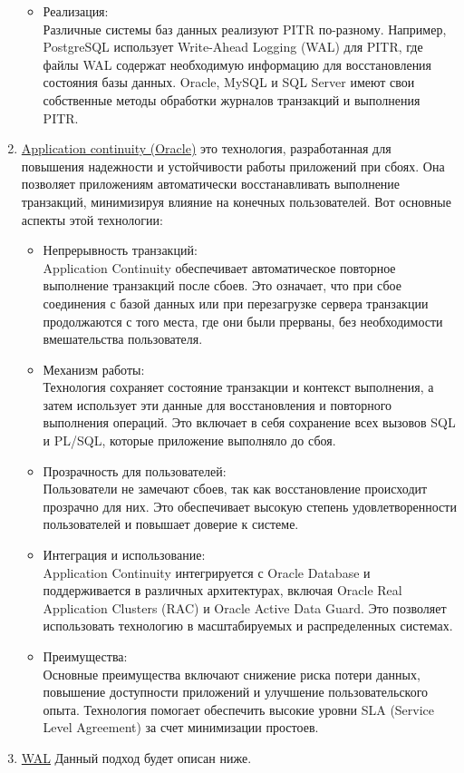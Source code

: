 \begin{enumerate}
\begin{itemize}
        \item Реализация: \\
        Различные системы баз данных реализуют PITR по-разному. Например, PostgreSQL использует Write-Ahead Logging (WAL) для PITR, где файлы WAL содержат необходимую информацию для восстановления состояния базы данных. Oracle, MySQL и SQL Server имеют свои собственные методы обработки журналов транзакций и выполнения PITR.
    \end{itemize}
    \item \underline{Application continuity (Oracle)} \cite{availability-ApplicationContinuity} это технология, разработанная для повышения надежности и устойчивости работы приложений при сбоях. Она позволяет приложениям автоматически восстанавливать выполнение транзакций, минимизируя влияние на конечных пользователей. Вот основные аспекты этой технологии:
    \begin{itemize}
        \item Непрерывность транзакций: \\
        Application Continuity обеспечивает автоматическое повторное выполнение транзакций после сбоев. Это означает, что при сбое соединения с базой данных или при перезагрузке сервера транзакции продолжаются с того места, где они были прерваны, без необходимости вмешательства пользователя.
        \item Механизм работы: \\
        Технология сохраняет состояние транзакции и контекст выполнения, а затем использует эти данные для восстановления и повторного выполнения операций. Это включает в себя сохранение всех вызовов SQL и PL/SQL, которые приложение выполняло до сбоя.
        \item Прозрачность для пользователей: \\
        Пользователи не замечают сбоев, так как восстановление происходит прозрачно для них. Это обеспечивает высокую степень удовлетворенности пользователей и повышает доверие к системе.
        \item Интеграция и использование: \\
        Application Continuity интегрируется с Oracle Database и поддерживается в различных архитектурах, включая Oracle Real Application Clusters (RAC) и Oracle Active Data Guard. Это позволяет использовать технологию в масштабируемых и распределенных системах.
        \item Преимущества: \\
        Основные преимущества включают снижение риска потери данных, повышение доступности приложений и улучшение пользовательского опыта. Технология помогает обеспечить высокие уровни SLA (Service Level Agreement) за счет минимизации простоев.
    \end{itemize}
    \item \underline{WAL} Данный подход будет описан ниже.
\end{enumerate}

